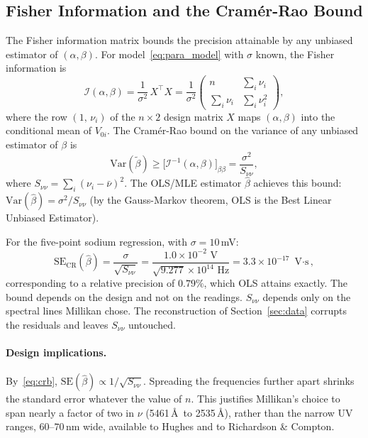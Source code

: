 \documentclass[12pt]{article}
\begin{document}
\subsection{Fisher Information and the Cram\'er-Rao Bound}
\label{sec:fisher}

The Fisher information matrix bounds the precision attainable by any
unbiased estimator of $(\alpha,\beta)$.  For model~\eqref{eq:para_model} with
$\sigma$ known, the Fisher information is
\begin{equation}\label{eq:fisher}
  \mathcal{I}(\alpha,\beta) =
  \frac{1}{\sigma^2}\,X^\top X =
  \frac{1}{\sigma^2}
  \begin{pmatrix} n & \sum_i\nu_i \\[4pt] \sum_i\nu_i & \sum_i\nu_i^2
  \end{pmatrix},
\end{equation}
where the row $(1,\,\nu_i)$ of the $n\times2$ design matrix $X$ maps
$(\alpha,\beta)$ into the conditional mean of $V_{0i}$.
The Cram\'er-Rao bound on the variance of any unbiased estimator of $\beta$ is
\begin{equation}\label{eq:crb}
  \mathrm{Var}(\tilde\beta) \geq
  \bigl[\mathcal{I}^{-1}(\alpha,\beta)\bigr]_{\beta\beta}
  = \frac{\sigma^2}{S_{\nu\nu}},
\end{equation}
where $S_{\nu\nu}=\sum_i(\nu_i-\bar\nu)^2$.  The OLS/MLE estimator
$\hat\beta$ achieves this bound: $\mathrm{Var}(\hat\beta) = \sigma^2/S_{\nu\nu}$
(by the Gauss-Markov theorem, OLS is the Best Linear Unbiased Estimator).

For the five-point sodium regression, with $\sigma = 10$\,mV:
\begin{equation}\label{eq:crb_num}
  \mathrm{SE}_{\mathrm{CR}}(\hat\beta) =
  \frac{\sigma}{\sqrt{S_{\nu\nu}}} =
  \frac{1.0\times10^{-2}\text{ V}}{\sqrt{9.277}\times10^{14}\text{ Hz}}
  = 3.3\times10^{-17}\text{ V$\cdot$s},
\end{equation}
corresponding to a relative precision of $0.79\%$, which OLS attains exactly.
The bound depends on the design and not on the readings.  $S_{\nu\nu}$ depends
only on the spectral lines Millikan chose.  The reconstruction of
Section~\ref{sec:data} corrupts the residuals and leaves $S_{\nu\nu}$
untouched.

\paragraph{Design implications.}  By~\eqref{eq:crb},
$\mathrm{SE}(\hat\beta) \propto 1/\sqrt{S_{\nu\nu}}$.  Spreading the
frequencies further apart shrinks the standard error whatever the value of
$n$.  This justifies Millikan's choice to span nearly a factor of two in $\nu$ (5461\,\AA\ to 2535\,\AA), rather
than the narrow UV ranges, $60$--$70$\,nm wide, available to Hughes and to
Richardson \& Compton.
\end{document}
